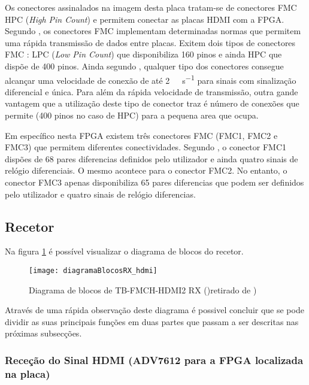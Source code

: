Os conectores assinalados na imagem desta placa tratam-se de conectores FMC HPC (\textit{High Pin Count}) e permitem conectar as placas HDMI com a FPGA. Segundo \cite{R030}, os conectores FMC implementam determinadas normas que permitem uma rápida transmissão de dados entre placas. Exitem dois tipos de conectores FMC : LPC (\textit{Low Pin Count}) que disponibiliza 160 pinos e ainda HPC que dispõe de 400 pinos. Ainda segundo \cite{R030}, qualquer tipo dos conectores consegue alcançar uma velocidade de conexão de até \SI{2}{\giga\bit\per\second} para sinais com sinalização diferencial e única. Para além da rápida velocidade de transmissão, outra gande vantagem que a utilização deste tipo de conector traz é número de conexões que permite (400 pinos no caso de HPC) para a pequena area que ocupa. 

Em específico nesta FPGA existem três conectores FMC (FMC1, FMC2 e FMC3) que permitem diferentes conectividades. Segundo \cite{R008}, o conector FMC1 dispões de 68 pares diferencias definidos pelo utilizador e ainda quatro sinais de relógio diferenciais. O mesmo acontece para o conector FMC2. No entanto, o conector FMC3 apenas disponibiliza 65 pares diferencias que podem ser definidos pelo utilizador e quatro sinais de relógio diferencias.

\subsection{Recetor} \label{subsec:RX}

Na figura \ref{fig:HDMIblocosRX} é possível visualizar o diagrama de blocos do recetor.

\begin{figure}[h!]
	\begin{center}
		\leavevmode
		\texttt{[image: diagramaBlocosRX\_hdmi]}
		\caption[Diagrama de blocos de TB-FMCH-HDMI2 RX]{Diagrama de blocos de TB-FMCH-HDMI2 RX ()retirado de \cite{R009})}
		\label{fig:HDMIblocosRX}
	\end{center}
\end{figure}

Através de uma rápida observação deste diagrama é possivel concluir que se pode dividir as suas principais funções em duas partes que passam a ser descritas nas próximas subsecções. 

\subsubsection{Receção do Sinal HDMI (ADV7612 para a FPGA localizada na placa)}
	
